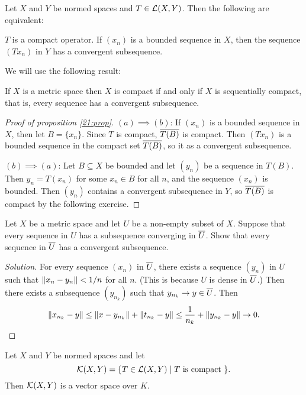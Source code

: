 \begin{prop}\label{21:prop}
  Let $X$ and $Y$ be normed spaces and $T \in \mathcal{L}(X,Y)$.
  Then the following are equivalent:
  \begin{enum}
    \io $T$ is a compact operator.
    \io If $(x_n)$ is a bounded sequence in $X$, then the sequence $(Tx_n)$ in $Y$ has a convergent subsequence.
  \end{enum}
\end{prop}

We will use the following result:
\begin{thm}
  If $X$ is a metric space then $X$ is compact if and only if $X$ is sequentially compact, that is, every sequence has a convergent subsequence.
\end{thm}

\begin{proof}[Proof of proposition \ref{21:prop}]
  $(a)\implies(b)$:
  If $(x_n)$ is a bounded sequence in $X$, then let $B = \{x_n\}$.
  Since $T$ is compact, $\overline{T(B)}$ is compact.
  Then $(Tx_n)$ is a bounded sequence in the compact set $\overline{T(B)}$, so it as a convergent subsequence.

  $(b)\implies(a)$:
  Let $B \subseteq X$ be bounded and let $(y_n)$ be a sequence in $T(B)$.
  Then $y_n=T(x_n)$ for some $x_n \in B$ for all $n$, and the sequence $(x_n)$ is bounded.
  Then $(y_n)$ contains a convergent subsequence in $Y$, so $\overline{T(B)}$ is compact by the following exercise.
\end{proof}

\begin{exer}
  Let $X$ be a metric space and let $U$ be a non-empty subset of $X$.
  Suppose that every sequence in $U$ has a subsequence converging in $\overline U$.
  Show that every sequence in $\overline U$ has a convergent subsequence.
\end{exer}

\begin{proof}[Solution]
  For every sequence $(x_n)$ in $\overline U$, there exists a sequence $(y_n)$ in $U$ such that $\left\lVert x_n-y_n \right\rVert<1/n$ for all $n$.
  (This is because $U$ is dense in $\overline U$.)
  Then there exists a subsequence $(y_{n_k})$ such that $y_{n_k} \to y \in \overline U$.
  Then
  \[ \left\lVert x_{n_k}-y \right\rVert \leq \left\lVert x-y_{n_k} \right\rVert + \left\lVert t_{n_k}-y \right\rVert \leq \frac{1}{n_k} + \left\lVert y_{n_k}-y \right\rVert \to 0. \qedhere \]
\end{proof}

\begin{prop}
  Let $X$ and $Y$ be normed spaces and let
  \[ \mathcal{K}(X,Y) = \{ T \in \mathcal{L}(X,Y) \mid T \text{ is compact } \}. \]
  Then $\mathcal{K}(X,Y)$ is a vector space over $K$.
\end{prop}

